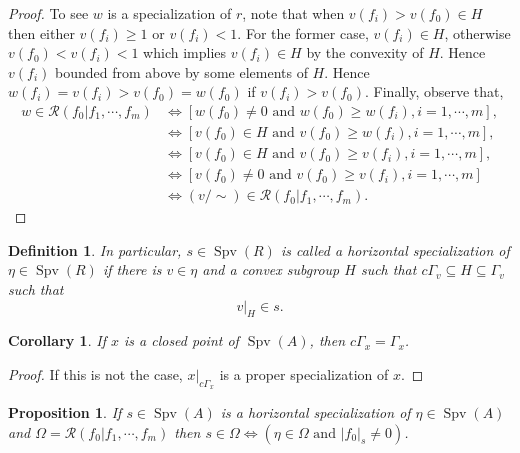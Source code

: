 \documentclass[8pt]{article}
\numberwithin{equation}{section}
\newtheorem{proposition}{Proposition}[subsection]
\newtheorem{definition}{Definition}[subsection]
\newtheorem{remark}{Remark}[subsection]
\newtheorem{corollary}{Corollary} [subsection]
\DeclareMathOperator{\Spv}{Spv}
\newcommand{\cR}[0]{\mathcal{R}}
\newcommand{\ab}[1]{\vert #1 \vert}
\newcommand{\cGamma}[0]{c\Gamma}
\newcommand{\tand}[0]{\text{ and }}
\begin{document}
\begin{proof}
    \par To see $w$ is a specialization of $r$, note that when $v(f_i)>v(f_0)\in H$ then either $v(f_i)\geq 1$ or $v(f_i)<1$. For the former case, $v(f_i)\in H$, otherwise $v(f_0)<v(f_i)<1$ which implies $v(f_i)\in H$ by the convexity of $H$. Hence $v(f_i)$ bounded from above by some elements of $H$. Hence $w(f_i)=v(f_i)>v(f_0) = w(f_0)$ if $v(f_i)>v(f_0)$. Finally, observe that,
    \begin{align*}
        w\in\cR(f_0|f_1,\cdots,f_m) &\iff [w(f_0)\not=0\text{ and } w(f_0)\geq w(f_i),i=1,\cdots,m],\\
        &\iff[v(f_0)\in H\text{ and }v(f_0)\geq w(f_i),i=1,\cdots,m],\\
        &\iff [v(f_0)\in H\tand v(f_0)\geq v(f_i),i=1,\cdots,m],\\
        &\iff [v(f_0)\not=0\tand v(f_0)\geq v(f_i),i=1,\cdots,m]\\
        &\iff (v/\sim)\in\cR(f_0|f_1,\cdots,f_m).
    \end{align*}
\end{proof}


\begin{definition}
    In particular, $s\in\Spv(R)$ is called a horizontal specialization of $\eta\in \Spv(R)$ if there is $v\in \eta$ and a convex subgroup $H$ such that $\cGamma_v\subseteq H\subseteq\Gamma_v$ such that 
    \begin{equation*}
        v|_H \in s.
    \end{equation*}
\end{definition}

\begin{corollary}
    \label{fact_7_9}
    If $x$ is a closed point of $\Spv(A)$, then $\cGamma_x=\Gamma_x$. 
\end{corollary}
\begin{proof}
    If this is not the case, $x|_{\cGamma_x}$ is a proper specialization of $x$.
\end{proof}

\begin{proposition}
    \label{fact_7_10}
    If $s\in\Spv(A)$ is a horizontal specialization of $\eta\in\Spv(A)$ and $\Omega=\cR(f_0|f_1,\cdots,f_m)$ then $s\in\Omega\iff(\eta\in\Omega\tand\ab{f_0}_s\not=0)$.
\end{proposition}
\end{document}

